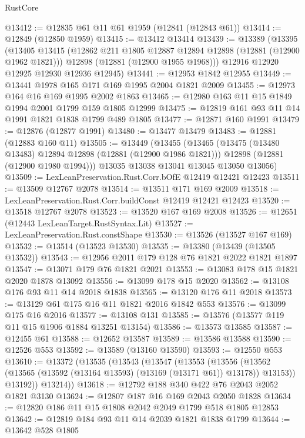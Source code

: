 \begin{lexlean}{RustCore}
\begin{coremodule}
@13412 := @12835 @61 @11 @61 @1959 (@12841 (@12843 @61))
@13414 := @12849 (@12850 @1959)
@13415 := @13412 @13414
@13439 := @13389
    (@13395
      (@13405
        @13415
        (@12862 @211 @1805 @12887 @12894 @12898 (@12881 (@12900 @1962 @1821)))
        @12898
        (@12881 (@12900 @1955 @1968)))
      @12916
      @12920
      @12925
      @12930
      @12936
      @12945)
@13441 := @12953 @1842 @12955
@13449 := @13441 @1978 @165 @171 @169 @1995 @2004 @1821 @2009
@13455 := @12973 @164 @16 @169 @1995 @2002 @1863
@13465 := @12980 @163 @11 @15 @1849 @1994 @2001 @1799 @159 @1805 @12999
@13475 := @12819 @161 @93 @11 @14 @1991 @1821 @1838 @1799 @489 @1805
@13477 := @12871 @160 @1991
@13479 := @12876 (@12877 @1991)
@13480 := @13477 @13479
@13483 := @12881 (@12883 @160 @11)
@13505 := @13449
    (@13455
      (@13465
        (@13475 (@13480 @13483) @12894 @12898 (@12881 (@12900 @1986 @1821)))
        @12898
        (@12881 (@12900 @1980 @1994)))
      @13035
      @13038
      @13041
      @13045
      @13050
      @13056)
@13509 := LexLeanPreservation.Rust.Corr.bOfE @12419 @12421 @12423
@13511 := @13509 @12767 @2078
@13514 := @13511 @171 @169 @2009
@13518 := LexLeanPreservation.Rust.Corr.buildConst @12419 @12421 @12423
@13520 := @13518 @12767 @2078
@13523 := @13520 @167 @169 @2008
@13526 := @12651 (@12443 LexLeanTarget.RustSyntax.Lit)
@13527 := LexLeanPreservation.Rust.constShape
@13530 := @13526 (@13527 @167 @169)
@13532 := @13514 (@13523 @13530)
@13535 := @13380 (@13439 (@13505 @13532))
@13543 := @12956 @2011 @179 @128 @76 @1821 @2022 @1821 @1897
@13547 := @13071 @179 @76 @1821 @2021
@13553 := @13083 @178 @15 @1821 @2020 @1878 @13092
@13556 := @13099 @178 @15 @2020
@13562 := @13108 @176 @93 @11 @14 @2018 @1838
@13565 := @13120 @176 @11 @2018
@13573 := @13129 @61 @175 @16 @11 @1821 @2016 @1842 @553
@13576 := @13099 @175 @16 @2016
@13577 := @13108 @131
@13585 := @13576 (@13577 @119 @11 @15 @1906 @1884 @13251 @13154)
@13586 := @13573 @13585
@13587 := @12455 @61
@13588 := @12652 @13587
@13589 := @13586 @13588
@13590 := @12526 @553
@13592 := @13589 (@13160 @13590)
@13593 := @12550 @553
@13610 := @13372
    (@13535
      (@13543
        (@13547
          (@13553
            (@13556 (@13562 (@13565 (@13592 (@13164 @13593) (@13169 (@13171 @61)) @13178)) @13153))
            @13192))
        @13214))
@13618 := @12792 @188 @340 @422 @76 @2043 @2052 @1821 @3130
@13624 := @12807 @187 @16 @169 @2043 @2050 @1828
@13634 := @12820 @186 @11 @15 @1808 @2042 @2049 @1799 @518 @1805 @12853
@13642 := @12819 @184 @93 @11 @14 @2039 @1821 @1838 @1799
@13644 := @13642 @528 @1805

\end{coremodule}
\end{lexlean}
